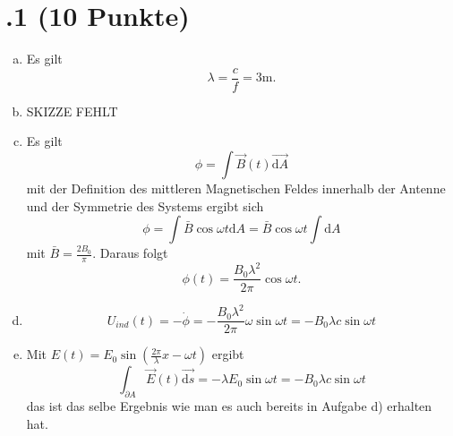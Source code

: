 \section*{\nr.1 \titone (10 Punkte)}
\begin{enumerate}[(a)]
\item
Es gilt 
\begin{equation}
  \lambda = \frac{c}{f} = 3\mathrm{m}.
\end{equation}
\item 
SKIZZE FEHLT
\item Es gilt
\begin{equation}
  \phi=\int\vec B(t) \vec{\mathrm{d}A}
\end{equation}
mit der Definition des mittleren Magnetischen Feldes innerhalb der Antenne und der Symmetrie des Systems ergibt sich
\begin{equation}
  \phi = \int \bar B \cos \omega t \mathrm{d}A=\bar B \cos \omega t \int \mathrm{d}A
\end{equation}
mit $\bar B = \frac{2B_0}{\pi}$.
Daraus folgt
\begin{equation}
  \phi(t)=\frac{B_0\lambda^2}{2\pi}\cos \omega t.
\end{equation}
\item
\begin{equation}
  U_{ind}(t)=-\dot{\phi}=-\frac{B_0\lambda^2}{2\pi}\omega \sin \omega t= -B_0\lambda c \sin \omega t 
\end{equation}
\item 
Mit $E(t)=E_0\sin( \frac{2\pi}{\lambda}x-\omega t)$ ergibt
\begin{equation}
  \int_{\partial A}\vec E(t) \vec{\mathrm{d}s}=-\lambda E_0\sin \omega t = -B_0\lambda c\sin \omega t
\end{equation}
das ist das selbe Ergebnis wie man es auch bereits in Aufgabe d) erhalten hat.


\end{enumerate}
